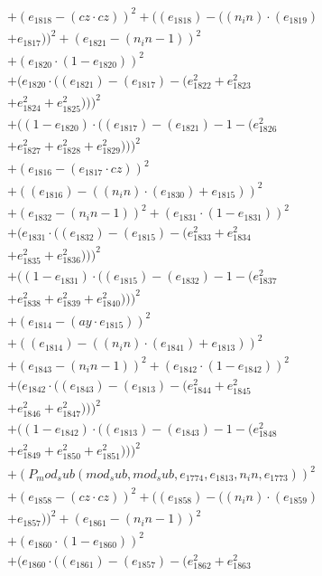 \documentclass[10pt, a4paper]{article}
\begin{document}
\begin{align*}
& + (e_{1818} - (cz  \cdot  cz))^{2} + ((e_{1818}) - ((n_in)  \cdot  (e_{1819}) \\
& + e_{1817}))^{2} + (e_{1821} - (n_in - 1))^{2} \\
& + (e_{1820}  \cdot  (1 - e_{1820}))^{2} \\
& + (e_{1820}  \cdot  ((e_{1821}) - (e_{1817}) - (e_{1822}^{2} + e_{1823}^{2} \\
& + e_{1824}^{2} + e_{1825}^{2})))^{2} \\
& + ((1 - e_{1820})  \cdot  ((e_{1817}) - (e_{1821}) - 1 - (e_{1826}^{2} \\
& + e_{1827}^{2} + e_{1828}^{2} + e_{1829}^{2})))^{2} \\
& + (e_{1816} - (e_{1817}  \cdot  cz))^{2} \\
& + ((e_{1816}) - ((n_in)  \cdot  (e_{1830}) + e_{1815}))^{2} \\
& + (e_{1832} - (n_in - 1))^{2} + (e_{1831}  \cdot  (1 - e_{1831}))^{2} \\
& + (e_{1831}  \cdot  ((e_{1832}) - (e_{1815}) - (e_{1833}^{2} + e_{1834}^{2} \\
& + e_{1835}^{2} + e_{1836}^{2})))^{2} \\
& + ((1 - e_{1831})  \cdot  ((e_{1815}) - (e_{1832}) - 1 - (e_{1837}^{2} \\
& + e_{1838}^{2} + e_{1839}^{2} + e_{1840}^{2})))^{2} \\
& + (e_{1814} - (ay  \cdot  e_{1815}))^{2} \\
& + ((e_{1814}) - ((n_in)  \cdot  (e_{1841}) + e_{1813}))^{2} \\
& + (e_{1843} - (n_in - 1))^{2} + (e_{1842}  \cdot  (1 - e_{1842}))^{2} \\
& + (e_{1842}  \cdot  ((e_{1843}) - (e_{1813}) - (e_{1844}^{2} + e_{1845}^{2} \\
& + e_{1846}^{2} + e_{1847}^{2})))^{2} \\
& + ((1 - e_{1842})  \cdot  ((e_{1813}) - (e_{1843}) - 1 - (e_{1848}^{2} \\
& + e_{1849}^{2} + e_{1850}^{2} + e_{1851}^{2})))^{2} \\
& + (P_mod_sub(mod_sub, mod_sub, e_{1774}, e_{1813}, n_in, e_{1773}))^{2} \\
& + (e_{1858} - (cz  \cdot  cz))^{2} + ((e_{1858}) - ((n_in)  \cdot  (e_{1859}) \\
& + e_{1857}))^{2} + (e_{1861} - (n_in - 1))^{2} \\
& + (e_{1860}  \cdot  (1 - e_{1860}))^{2} \\
& + (e_{1860}  \cdot  ((e_{1861}) - (e_{1857}) - (e_{1862}^{2} + e_{1863}^{2} \\

\end{align*}
\end{document}
